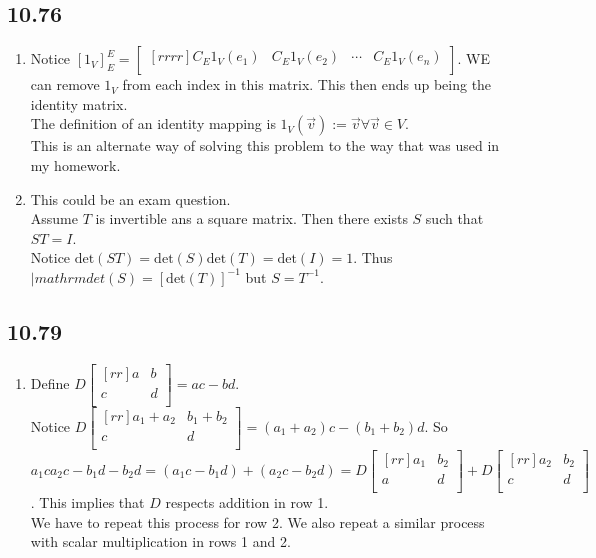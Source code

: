 \documentclass{report}
\begin{document}
\subsection{10.76}
\begin{enumerate}
\item Notice $[1_V]_E^E=\begin{bmatrix}[rrrr]C_E1_V(e_1)&C_E1_V(e_2)&\cdots &C_E1_V(e_n)\\\end{bmatrix}$. WE can remove $1_V$ from each index in this matrix. This then ends up being the identity matrix.\\
The definition of an identity mapping is $1_V(\vec{v}):=\vec{v}\forall\vec{v}\in V$.\\
This is an alternate way of solving this problem to the way that was used in my homework.
\item This could be an exam question.\\
Assume $T$ is invertible ans a square matrix. Then there exists $S$ such that $ST=I$.\\
Notice $\mathrm{det}(ST)=\mathrm{det}(S)\mathrm{det}(T)=\mathrm{det}(I)=1$. Thus $|mathrm{det}(S)=[\mathrm{det}(T)]^{-1}$ but $S=T^{-1}$.
\end{enumerate}
\subsection{10.79}
\begin{enumerate}
\item Define $D\begin{bmatrix}[rr]a&b\\c&d\\\end{bmatrix}=ac-bd$.\\
Notice $D\begin{bmatrix}[rr]a_1+a_2&b_1+b_2\\c&d\\\end{bmatrix}=(a_1+a_2)c-(b_1+b_2)d$. So $a_1ca_2c-b_1d-b_2d=(a_1c-b_1d)+(a_2c-b_2d) = D\begin{bmatrix}[rr]a_1&b_2\\a&d\\\end{bmatrix}+D\begin{bmatrix}[rr]a_2&b_2\\c&d\\\end{bmatrix}$. This implies that $D$ respects addition in row 1.\\
We have to repeat this process for row 2. We also repeat a similar process with scalar multiplication in rows 1 and 2.
\end{enumerate}
\end{document}
